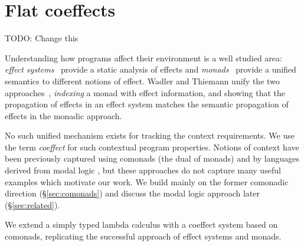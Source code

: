 \chapter{Flat coeffects} 
\label{ch:flat-coeffects} 


\newcommand{\iunit}{\mathsf{e}}
\newcommand{\imult}{\oplus}
\newcommand{\iftor}[1]{C^{#1}}
\newcommand{\iftorhat}[1]{\hat{C}^{#1}}

\newcommand{\cosem}[1]{\llbracket #1 \rrbracket}
\newcommand{\interp}[1]{\llbracket #1 \rrbracket}
\newcommand{\ccat}[0]{\mathcal{C}}
\newcommand{\obj}[1]{\textnormal{obj}(#1)}

\newcommand{\cobind}[2]{#1^\dagger_{#2}}
\newcommand{\cmerge}[0]{ \ident{m} }
\newcommand{\csplit}[0]{ \ident{n} }
\newcommand{\counit}[0]{ \varepsilon }



TODO: Change this

Understanding how programs affect their environment is a well studied area: \emph{effect 
systems}~\cite{effects-talpin-et-al} provide a static analysis of effects and 
\emph{monads}~\cite{monad-notions} provide a unified semantics to different notions of effect.  
Wadler and Thiemann unify the two approaches~\cite{monads-effects-marriage}, \emph{indexing}
a monad with effect information, and showing that the propagation of effects in an effect system 
matches the semantic propagation of effects in the monadic approach.

No such unified mechanism exists for tracking the context requirements. We use the term 
\emph{coeffect} for such contextual program properties. 
Notions of context have been previously captured using comonads
\cite{comonads-notions} (the dual of monads) 
and by languages derived from modal logic
\cite{logic-modal-reconstruction,logic-cmtt}, but these approaches
do not capture many useful examples which motivate our work. 
We build mainly on the former comonadic direction (\S\ref{sec:comonads}) and discuss the
modal logic approach later (\S\ref{sec:related}).

We extend a simply typed lambda calculus with a coeffect system based on comonads,
replicating the successful approach of effect systems and monads.

